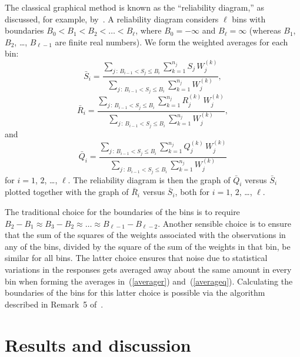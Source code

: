 \documentclass{article}
\begin{document}
The classical graphical method is known as the ``reliability diagram,''
as discussed, for example, by~\cite{brocker-smith}.
A reliability diagram considers $\ell$ bins with boundaries
$B_0 < B_1 < B_2 < \dots < B_{\ell}$,
where $B_0 = -\infty$ and $B_{\ell} = \infty$
(whereas $B_1$, $B_2$, \dots, $B_{\ell - 1}$ are finite real numbers).
We form the weighted averages for each bin:
%
\begin{equation}
\bar{S}_i = \frac{\sum_{j\,:\,B_{i-1} < S_j \le B_i}
                  \sum_{k=1}^{n_j} S_j \, W^{(k)}_j}
                 {\sum_{j\,:\,B_{i-1} < S_j \le B_i}
                  \sum_{k=1}^{n_j} W^{(k)}_j},
\end{equation}
%
\begin{equation}
\label{averager}
\bar{R}_i = \frac{\sum_{j\,:\,B_{i-1} < S_j \le B_i}
                  \sum_{k=1}^{n_j} R^{(k)}_j \, W^{(k)}_j}
                 {\sum_{j\,:\,B_{i-1} < S_j \le B_i}
                  \sum_{k=1}^{n_j} W^{(k)}_j},
\end{equation}
%
and
%
\begin{equation}
\label{averageq}
\bar{Q}_i = \frac{\sum_{j\,:\,B_{i-1} < S_j \le B_i}
                  \sum_{k=1}^{n_j} Q^{(k)}_j \, W^{(k)}_j}
                 {\sum_{j\,:\,B_{i-1} < S_j \le B_i}
                  \sum_{k=1}^{n_j} W^{(k)}_j}
\end{equation}
%
for $i = 1$, $2$, \dots, $\ell$.
The reliability diagram is then the graph of $\bar{Q}_i$ versus $\bar{S}_i$
plotted together with the graph of $\bar{R}_i$ versus $\bar{S}_i$,
both for $i = 1$, $2$, \dots, $\ell$.

The traditional choice for the boundaries of the bins is to require
$B_2 - B_1 \approx B_3 - B_2 \approx \dots \approx B_{\ell-1} - B_{\ell-2}$.
Another sensible choice is to ensure that the sum of the squares of the weights
associated with the observations in any of the bins,
divided by the square of the sum of the weights in that bin,
be similar for all bins. The latter choice ensures that noise
due to statistical variations in the responses gets averaged away
about the same amount in every bin when forming the averages
in~(\ref{averager}) and~(\ref{averageq}).
Calculating the boundaries of the bins for this latter choice is possible
via the algorithm described in Remark~5 of~\cite{tygert_full}.



\section{Results and discussion}
\label{results}
\end{document}
